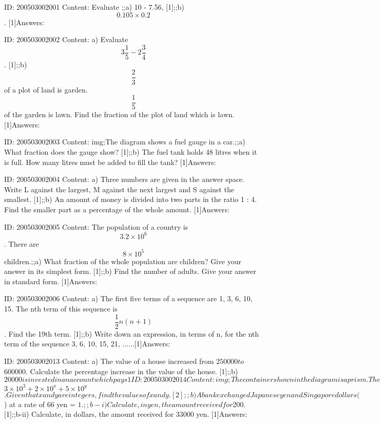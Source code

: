 \documentclass{article}
\begin{document}
ID: 200503002001
Content:
Evaluate ;;a) 10 - 7.56, [1];;b) $$0.105 \times 0.2$$. [1]Answers:

ID: 200503002002
Content:
a) Evaluate $$3\frac{1}{5}-2\frac{3}{4}$$. [1];;b) $$\frac{2}{3}$$of a plot of land is garden. $$\frac{1}{5}$$ of the garden is lawn. Find the fraction of the plot of land which is lawn. [1]Answers:

ID: 200503002003
Content:
img;The diagram shows a fuel gauge in a car.;;a) What fraction does the gauge show? [1];;b) The fuel tank holds 48 litres when it is full. How many litres must be added to fill the tank? [1]Answers:

ID: 200503002004
Content:
a) Three numbers are given in the answer space. Write L against the largest, M against the next largest and S against the smallest. [1];;b) An amount of money is divided into two parts in the ratio 1 : 4. Find the smaller part as a percentage of the whole amount. [1]Answers:

ID: 200503002005
Content:
The population of a country is $$3.2 \times 10^6$$. There are $$8 \times 10^5$$ children.;;a) What fraction of the whole population are children? Give your answer in its simplest form. [1];;b) Find the number of adults. Give your answer in standard form. [1]Answers:

ID: 200503002006
Content:
a) The first five terms of a sequence are 1, 3, 6, 10, 15. The nth term of this sequence is $$\frac{1}{2}n(n+1)$$. Find the 19th term. [1];;b) Write down an expression, in terms of n, for the nth term of the sequence 3, 6, 10, 15, 21, ......[1]Answers:

ID: 200503002013
Content:
a) The value of a house increased from $250000 to $600000. Calculate the percentage increase in the value of the house. [1];;b) $20000 is invested in an account which pays 1%

ID: 200503002014
Content:
img;The container shown in the diagram is a prism. The cross-section consists of a rectangle and a triangle. The heights of both the rectangle and the triangle is 5 cm. Water is poured into the empty container at a constant rate and fills it in 6 minutes.;;a) After how many minutes will the triangular prism be full? [1];;b) On the axes in the answer space, sketch the graph showing how the depth of the water, d centimeters, in the container varies over the 6 minutes. [2];img;Answers:

ID: 200503002018
Content:
a) The number 3002.05 can be written as $$3 \times 10^{3}  + 2 \times 10^{x} + 5 \times 10^{y}$$. Given that x and y are integers, find the values of x and y. [2];;b) A bank exchanged Japanese yen and Singapore dollars ($) at a rate of 66 yen = $1.;;b-i) Calculate, in yen, the amount received for $200. [1];;b-ii) Calculate, in dollars, the amount received for 33000 yen. [1]Answers:
\end{document}
